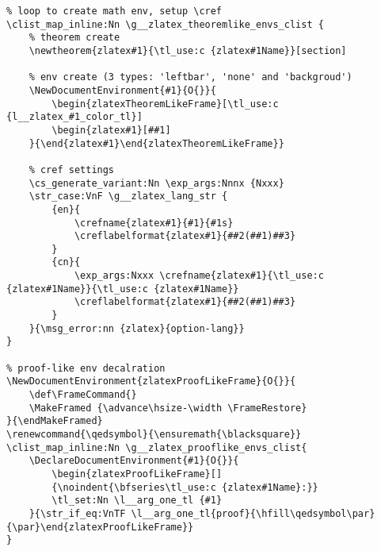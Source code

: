 \begin{verbatim}
% loop to create math env, setup \cref
\clist_map_inline:Nn \g__zlatex_theoremlike_envs_clist {
    % theorem create
    \newtheorem{zlatex#1}{\tl_use:c {zlatex#1Name}}[section]

    % env create (3 types: 'leftbar', 'none' and 'backgroud')
    \NewDocumentEnvironment{#1}{O{}}{
        \begin{zlatexTheoremLikeFrame}[\tl_use:c {l__zlatex_#1_color_tl}]
        \begin{zlatex#1}[##1]
    }{\end{zlatex#1}\end{zlatexTheoremLikeFrame}}

    % cref settings
    \cs_generate_variant:Nn \exp_args:Nnnx {Nxxx}
    \str_case:VnF \g__zlatex_lang_str {
        {en}{
            \crefname{zlatex#1}{#1}{#1s}
            \creflabelformat{zlatex#1}{##2(##1)##3}
        }
        {cn}{
            \exp_args:Nxxx \crefname{zlatex#1}{\tl_use:c {zlatex#1Name}}{\tl_use:c {zlatex#1Name}}
            \creflabelformat{zlatex#1}{##2(##1)##3}
        }
    }{\msg_error:nn {zlatex}{option-lang}}
}

% proof-like env decalration
\NewDocumentEnvironment{zlatexProofLikeFrame}{O{}}{
    \def\FrameCommand{}
    \MakeFramed {\advance\hsize-\width \FrameRestore}
}{\endMakeFramed}
\renewcommand{\qedsymbol}{\ensuremath{\blacksquare}}
\clist_map_inline:Nn \g__zlatex_prooflike_envs_clist{
    \DeclareDocumentEnvironment{#1}{O{}}{
        \begin{zlatexProofLikeFrame}[]
        {\noindent{\bfseries\tl_use:c {zlatex#1Name}:}}
        \tl_set:Nn \l__arg_one_tl {#1}
    }{\str_if_eq:VnTF \l__arg_one_tl{proof}{\hfill\qedsymbol\par}{\par}\end{zlatexProofLikeFrame}}
}
\end{verbatim}

